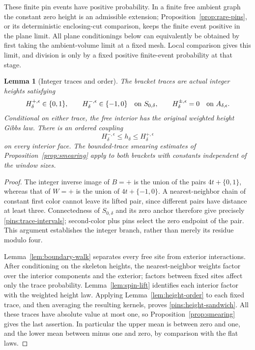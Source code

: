 \documentclass[11pt]{article}
\newtheorem{lemma}[theorem]{Lemma}
\theoremstyle{definition}
\theoremstyle{remark}
\numberwithin{equation}{section}
\begin{document}
These finite pin events have positive probability.  In a finite free
ambient graph the constant zero height is an admissible extension;
Proposition~\ref{prop:rare-pins}, or its deterministic enclosing-cut
comparison, keeps the finite event positive in the plane limit.  All
plane conditionings below can equivalently be obtained by first taking
the ambient-volume limit at a fixed mesh.  Local comparison gives this
limit, and division is only by a fixed positive finite-event probability
at that stage.

\begin{lemma}[Integer traces and order]\label{pins:bracket-order}
The bracket traces are actual integer heights satisfying
\begin{equation}\label{pins:trace-intervals}
 H_\delta^{+,\epsilon}\in\{0,1\},\qquad
 H_\delta^{-,\epsilon}\in\{-1,0\}
 \quad\hbox{on }S_{0,\delta},\qquad
 H_\delta^{\pm,\epsilon}=0\quad\hbox{on }A_{\delta,\epsilon}.
\end{equation}
Conditional on either trace, the free interior has the original weighted
height Gibbs law.  There is an ordered coupling
\begin{equation}\label{pins:height-sandwich}
 H_\delta^{-,\epsilon}\le h_\delta\le H_\delta^{+,\epsilon}
\end{equation}
on every interior face.  The bounded-trace smearing estimates of
Proposition~\ref{prop:smearing} apply to both brackets with constants
independent of the window sizes.
\end{lemma}

\begin{proof}
The integer inverse image of $B=+$ is the union of the pairs
$4t+\{0,1\}$, whereas that of $W=+$ is the union of
$4t+\{-1,0\}$.  A nearest-neighbor chain of constant first color cannot
leave its lifted pair, since different pairs have distance at least
three.  Connectedness of $S_{0,\delta}$ and its zero anchor therefore
give precisely \eqref{pins:trace-intervals}; second-color plus pins
select the zero endpoint of the pair.  This argument establishes the
integer branch, rather than merely its residue modulo four.

Lemma~\ref{lem:boundary-walk} separates every free site from exterior
interactions.  After conditioning on the skeleton heights, the
nearest-neighbor weights factor over the interior components and the
exterior; factors between fixed sites affect only the trace probability.
Lemma~\ref{lem:spin-lift} identifies each interior factor with the
weighted height law.  Applying Lemma~\ref{lem:height-order} to each
fixed trace, and then averaging the resulting kernels, proves
\eqref{pins:height-sandwich}.  All these traces have absolute value at
most one, so Proposition~\ref{prop:smearing} gives the last assertion.
In particular the upper mean is between zero and one, and the lower
mean between minus one and zero, by comparison with the flat laws.
\end{proof}
\end{document}
